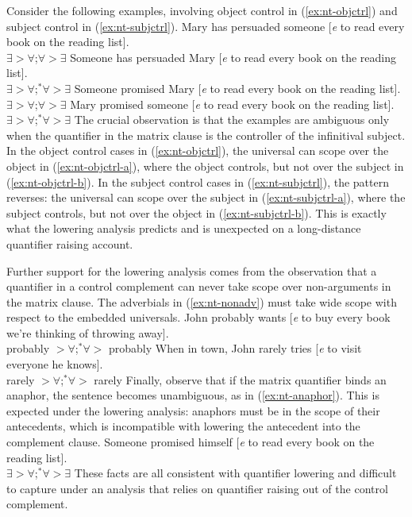 \documentclass[12pt]{article}
\begin{document}
Consider the following examples, involving object control in (\ref{ex:nt-objctrl}) and subject control in (\ref{ex:nt-subjctrl}).
%
\pex\label{ex:nt-objctrl}
\a\label{ex:nt-objctrl-a} Mary has persuaded someone [\emph{e} to read every book on the reading list].\\
$\exists > \forall$;\quad $\forall > \exists$
\a\label{ex:nt-objctrl-b} Someone has persuaded Mary [\emph{e} to read every book on the reading list].\\
$\exists > \forall$;\quad $^*\forall > \exists$
\xe
%
\pex\label{ex:nt-subjctrl}
\a\label{ex:nt-subjctrl-a} Someone promised Mary [\emph{e} to read every book on the reading list].\\
$\exists > \forall$;\quad $\forall > \exists$
\a\label{ex:nt-subjctrl-b} Mary promised someone [\emph{e} to read every book on the reading list].\\
$\exists > \forall$;\quad $^*\forall > \exists$
\xe
%
The crucial observation is that the examples are ambiguous only when the quantifier in the matrix clause is the controller of the infinitival subject. In the object control cases in (\ref{ex:nt-objctrl}), the universal can scope over the object in (\ref{ex:nt-objctrl-a}), where the object controls, but not over the subject in (\ref{ex:nt-objctrl-b}). In the subject control cases in (\ref{ex:nt-subjctrl}), the pattern reverses: the universal can scope over the subject in (\ref{ex:nt-subjctrl-a}), where the subject controls, but not over the object in (\ref{ex:nt-subjctrl-b}). This is exactly what the lowering analysis predicts and is unexpected on a long-distance quantifier raising account.

Further support for the lowering analysis comes from the observation that a quantifier in a control complement can never take scope over non-arguments in the matrix clause. The adverbials in (\ref{ex:nt-nonadv}) must take wide scope with respect to the embedded universals.
%
\pex\label{ex:nt-nonadv}
\a John probably wants [\emph{e} to buy every book we're thinking of throwing away].\\
probably $> \forall$;\quad $^*\forall >$ probably
\a When in town, John rarely tries [\emph{e} to visit everyone he knows].\\
rarely $> \forall$;\quad $^*\forall >$ rarely
\xe
%
Finally, \citeauthor{neeleman2006} observe that if the matrix quantifier binds an anaphor, the sentence becomes unambiguous, as in (\ref{ex:nt-anaphor}). This is expected under the lowering analysis: anaphors must be in the scope of their antecedents, which is incompatible with lowering the antecedent into the complement clause.
%
\ex\label{ex:nt-anaphor}
Someone promised himself [\emph{e} to read every book on the reading list].\\
$\exists > \forall$;\quad $^*\forall > \exists$
\xe
%
These facts are all consistent with quantifier lowering and difficult to capture under an analysis that relies on quantifier raising out of the control complement.
\end{document}
